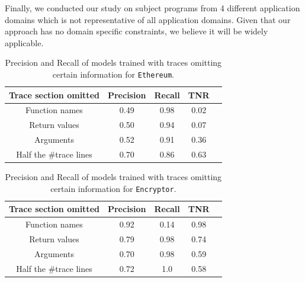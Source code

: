 Finally, we conducted our study on subject programs from 4 different application domains which is not representative of all application domains. %
Given that our approach has no domain specific constraints, we believe it will be widely applicable. %

\iffalse

\begin{table}[]
\centering
\begin{tabular}{|c|c|c|c|c|}
	\hline
	Trace section omitted   & {Precision} & {Recall} & TNR\\ 
	\hline \hline
	Function names  & 0.49 & 0.98 & 0.02 \\ \hline 
	Return values & 0.50  & 0.94 & 0.07 \\ \hline
	Arguments & 0.52  & 0.91 & 0.36 \\ \hline
	Half the \#trace lines & 0.70 & 0.86 & 0.63 \\ \hline 
\end{tabular}
\caption{Precision and Recall of models trained with traces omitting certain information for \texttt{Ethereum}. }
\label{tab:ethereum_removed_trace}
\end{table}

\begin{table}[]
\centering
\begin{tabular}{|c|c|c|c|c|}
	\hline
	Trace section omitted   & {Precision} & {Recall} & TNR\\ 
	\hline \hline
	Function names  & 0.92 & 0.14 & 0.98 \\ \hline 
	Return values & 0.79  & 0.98 & 0.74 \\ \hline
	Arguments & 0.70  & 0.98 & 0.59 \\ \hline
	Half the \#trace lines & 0.72 & 1.0 & 0.58 \\ \hline 
\end{tabular}
\caption{Precision and Recall of models trained with traces omitting certain information for \texttt{Encryptor}. }
\label{tab:encryptor_removed_trace}
\end{table}

